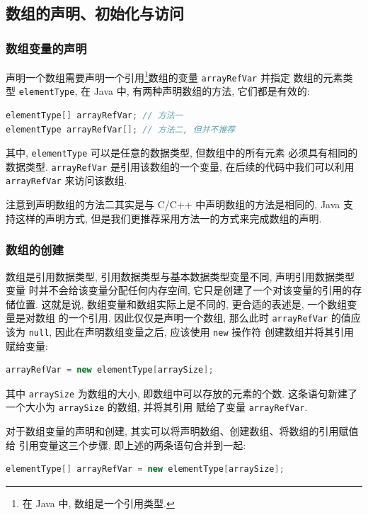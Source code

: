 \documentclass[10pt,UTF8]{book} %
\begin{document}
\subsection{数组的声明、初始化与访问}

\subsubsection{数组变量的声明}

声明一个数组需要声明一个引用\footnote{
    在 Java 中, 数组是一个引用类型.
}数组的变量 \lstinline|arrayRefVar| 并指定
数组的元素类型 \lstinline|elementType|, 在 Java 中, 有两种声明数组的方法, 
它们都是有效的:
\begin{lstlisting}[language=Java]
elementType[] arrayRefVar; // 方法一
elementType arrayRefVar[]; // 方法二, 但并不推荐
\end{lstlisting}
其中, \lstinline|elementType| 可以是任意的数据类型, 但数组中的所有元素
必须具有相同的数据类型. \lstinline|arrayRefVar| 是引用该数组的一个变量,
在后续的代码中我们可以利用 \lstinline|arrayRefVar| 来访问该数组.

注意到声明数组的方法二其实是与 C/C++ 中声明数组的方法是相同的,
Java 支持这样的声明方式, 但是我们更推荐采用方法一的方式来完成数组的声明.

\subsubsection{数组的创建}

数组是引用数据类型, 引用数据类型与基本数据类型变量不同, {\kaishu 声明引用数据类型变量
时并不会给该变量分配任何内存空间}, 它只是创建了一个对该变量的引用的存储位置.
这就是说, 数组变量和数组实际上是不同的, 更合适的表述是, {\kaishu 一个数组变量是对数组
的一个引用}.
因此仅仅是声明一个数组, 那么此时 \lstinline|arrayRefVar| 的值应该为
\lstinline|null|, 因此在声明数组变量之后, 应该使用 \lstinline|new| 操作符
创建数组并将其引用赋给变量:
\begin{lstlisting}[language=Java]
arrayRefVar = new elementType[arraySize];
\end{lstlisting}
其中 \lstinline|arraySize| 为数组的大小, 即数组中可以存放的元素的个数.
这条语句新建了一个大小为 \lstinline|arraySize| 的数组, 并将其引用
赋给了变量 \lstinline|arrayRefVar|.

对于数组变量的声明和创建, 其实可以将声明数组、创建数组、将数组的引用赋值给
引用变量这三个步骤, 即上述的两条语句合并到一起:
\begin{lstlisting}[language=Java]
elementType[] arrayRefVar = new elementType[arraySize];
\end{lstlisting}
\end{document}
